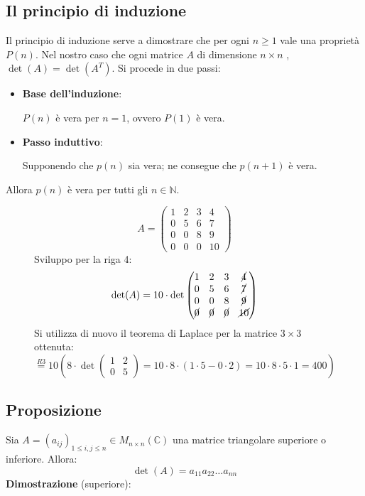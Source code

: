 \documentclass[a4paper]{article}
\theoremstyle{break}
\theoremstyle{break}
\theoremstyle{break}
\theoremstyle{break}
\begin{document}
\subsection{Il principio di induzione}
Il principio di induzione serve a dimostrare che per ogni \( n \ge 1 \) vale una 
proprietà \( P(n) \). Nel nostro caso che ogni matrice \( A \) di dimensione \( n \times n \) 
, \( \det(A) = \det(A^T) \). Si procede in due passi:
\begin{itemize}
  \item \textbf{Base dell'induzione}:

    \( P(n) \) è vera per \( n = 1 \), ovvero \( P(1) \) è vera.
  \item \textbf{Passo induttivo}:

    Supponendo che \( p(n) \) sia vera; ne consegue che \( p(n+1) \) è vera.
\end{itemize}
Allora \( p(n) \) è vera per tutti gli \( n \in \mathbb{N} \).

\begin{figure}[H]
  \begin{example}
    \[
    A = \begin{pmatrix} 
      1 & 2 & 3 & 4\\
      0 & 5 & 6 & 7\\
      0 & 0 & 8 & 9\\
      0 & 0 & 0 & 10
    \end{pmatrix} 
    \] 
    Sviluppo per la riga 4:
    \[
    \det(A) = 10 \cdot \det\begin{pmatrix} 
      1 & 2 & 3 & \cancel{4}\\
      0 & 5 & 6 & \cancel{7}\\
      0 & 0 & 8 & \cancel{9}\\
      \cancel{0} & \cancel{0} & \cancel{0} & \cancel{10}
    \end{pmatrix}
    \] 
    Si utilizza di nuovo il teorema di Laplace per la matrice \( 3 \times 3 \) ottenuta:
    \[
    \stackrel{R3}{=} 10 \left( 8 \cdot \det\begin{pmatrix} 
      1 & 2 \\
      0 & 5
    \end{pmatrix}
    = 10 \cdot 8 \cdot (1 \cdot 5 - 0 \cdot 2) = 10 \cdot 8 \cdot 5 \cdot 1 = 400
    \right) 
    \] 
  \end{example}
\end{figure}

\subsection{Proposizione}
\label{4.10}
Sia \( A = (a_{ij})_{1 \le i,j \le n} \in M_{n \times n}(\mathbb{C}) \) una matrice
triangolare superiore o inferiore. Allora:
\[
\det(A) = a_{11}a_{22} \ldots a_{nn}
\] 
\textbf{Dimostrazione} (superiore):
\end{document}
